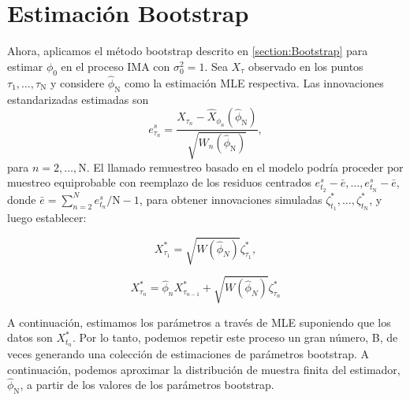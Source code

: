 \section{Estimación Bootstrap}

Ahora, aplicamos el método bootstrap descrito en \ref{section:Bootstrap} para estimar $\phi_0$ 
en el proceso IMA con $\sigma_0^2=1$. Sea $X_\tau$ observado en los puntos $\tau_1, \ldots, \tau_{\mathrm{N}}$ y 
considere $\hat{\phi}_{\mathrm{N}}$ como la estimación MLE respectiva. Las innovaciones estandarizadas estimadas son
$$
e_{\tau_n}^s=\frac{X_{\tau_n}-\hat{X}_{\phi_n}\left(\hat{\phi}_{\mathrm{N}}\right)}{\sqrt{W_n\left(\hat{\phi}_{\mathrm{N}}\right)}},
$$
para $n=2, \ldots, \mathrm{N}$. El llamado remuestreo basado en el modelo podría proceder por muestreo equiprobable 
con reemplazo de los residuos centrados $e_{t_2}^s-\bar{e}, \ldots, e_{t_{\mathrm{N}}}^s-\bar{e}$, donde $\bar{e}=\sum_{n=2}^N e_{t_n}^s / \mathrm{N}-1$,
para obtener innovaciones simuladas $\zeta_{t_1}^*, \ldots, \zeta_{t_{\mathrm{N}}}^*$, y luego establecer:

\begin{equation}
    X_{\tau_1}^* = \sqrt{W(\hat{\phi}_N)}\zeta_{\tau_1}^*, 
\end{equation}

\begin{equation}
    X_{\tau_n}^* = \hat{\phi}_{n}X_{\tau_{n-1}}^* + \sqrt{W(\hat{\phi}_N)}\zeta_{\tau_n}^*
\end{equation}

A continuación, estimamos los parámetros a través de MLE suponiendo que los datos son $X_{t_n}^*$. Por lo tanto, podemos repetir este proceso un gran número, B, de veces generando una colección de estimaciones de parámetros bootstrap. A continuación, podemos aproximar la distribución de muestra finita del estimador, $ {\hat{\phi}_{\mathrm{N}}}$, a partir de los valores de los parámetros bootstrap.

